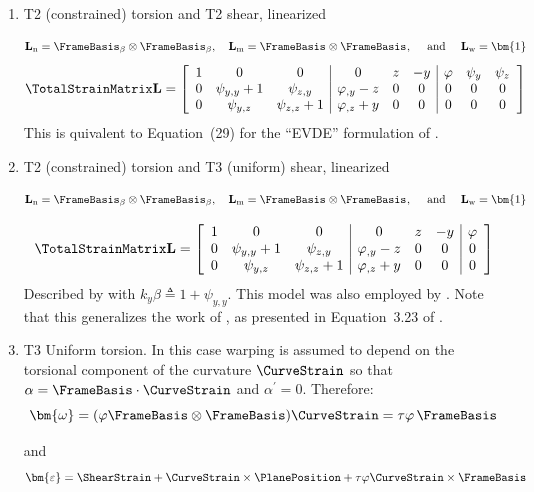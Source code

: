 \begin{enumerate}
\item T2 (constrained) torsion and T2 shear, linearized

$$
\mathbf{L}_{\mathrm{n}} = \FrameBasis_{\beta} \otimes \FrameBasis_{\beta}, \quad
\mathbf{L}_{\mathrm{m}} = \FrameBasis_{} \otimes \FrameBasis_{},
\quad\text{ and }\quad
\mathbf{L}_{\mathrm{w}} = \bm{1}
$$
$$
\TotalStrainMatrix\mathbf{L} = \left[\begin{array}{ccc|ccc|ccc}
1 & 0 & 0 & 0 & z & - y & \varphi & \psi_{y} & \psi_{z}\\
0 & \psi_{y,y} + 1 & \psi_{z,y} & \varphi_{,y} - z & 0 & 0 & 0 & 0 & 0\\
0 & \psi_{y,z} & \psi_{z,z} + 1 & \varphi_{,z} + y & 0 & 0 & 0 & 0 & 0
\end{array}\right]
$$
This is quivalent to Equation~(29) for the ``EVDE'' formulation of  \cite{addessi2021enriched}. 
\item T2 (constrained) torsion and T3 (uniform) shear, linearized

$$
\mathbf{L}_{\mathrm{n}} = \FrameBasis_{\beta} \otimes \FrameBasis_{\beta}, \quad
\mathbf{L}_{\mathrm{m}} = \FrameBasis_{} \otimes \FrameBasis_{},
\quad\text{ and }\quad
\mathbf{L}_{\mathrm{w}} = \bm{1}
$$

$$
\TotalStrainMatrix\mathbf{L} = \left[\begin{array}{ccc|ccc|c}
1 & 0 & 0 & 0 & z & - y & \varphi \\
0 & \psi_{y,y} + 1 & \psi_{z,y} & \varphi_{,y} - z & 0 & 0 & 0 \\
0 & \psi_{y,z} & \psi_{z,z} + 1 & \varphi_{,z} + y & 0 & 0 & 0 
\end{array}\right]
$$
Described by \cite[Section 3.1.2]{lecorvec2012nonlinear} with \(k_y \beta  \triangleq 1+\psi_{y,y}\). This model was also employed by \cite[Equation 3.51]{dire20173d}. 
%
Note that this generalizes the work of \cite{saritas2006mixed}, as presented in Equation~3.23 of \cite{dire20173d}.

\item T3 {Uniform torsion}.  In this case warping is assumed to depend on the torsional component of the curvature $\CurveStrain $ so that $\alpha = \FrameBasis\cdot\CurveStrain $ and $\alpha^{\prime}=0$. Therefore:
$$
\bm{\omega} = (\varphi \FrameBasis\otimes\FrameBasis)\CurveStrain  = \tau \varphi \, \FrameBasis
$$
\begin{Details}
and
$$
\bm{\varepsilon} = \ShearStrain  + \CurveStrain \times\PlanePosition  + \tau\varphi \CurveStrain \times\FrameBasis
$$
\end{Details}


\end{enumerate}
